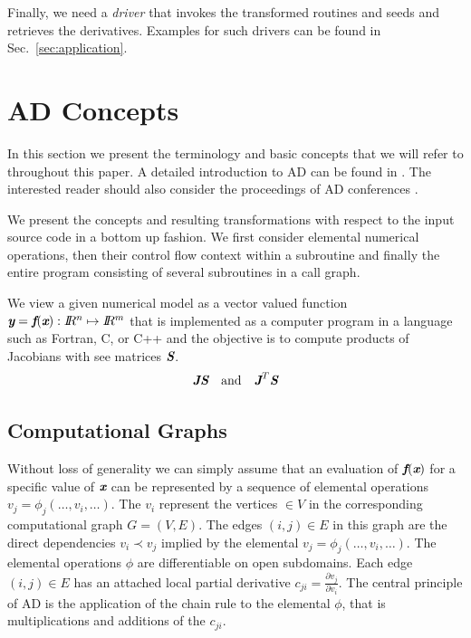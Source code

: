 \documentclass{book}
\newcommand{\R}{I\!\!R}
\newcommand{\bmf}{\mbox{\bf\em f}}
\newcommand{\bmJ}{\mbox{\bf\em J}}
\newcommand{\bmS}{\mbox{\bf\em S}}
\newcommand{\bmx}{\mbox{\bf\em x}}
\newcommand{\bmy}{\mbox{\bf\em y}}
\newcommand{\refsec}[1]{{Sec.~\ref{#1}}}
\begin{document}
Finally, we need a {\em driver} that invokes the transformed routines and seeds and retrieves the derivatives.
Examples for such drivers can be found in \refsec{sec:application}.

\chapter{AD Concepts}\label{sec:ADIntro}

In this section we present the terminology and basic concepts that 
we will refer to throughout this paper. 
A detailed introduction to AD can be found in \cite{Gri00}.
The interested reader should also consider the proceedings of AD 
conferences \cite{CG91,BBCG96,CFG+01,BCH+06}.

We present the concepts and resulting transformations 
with respect to the input source code 
in a bottom up fashion.  
We first consider elemental numerical operations, 
then their control flow context within a subroutine and finally the entire program 
consisting of several subroutines in a call graph. 

We view a given numerical model as a 
vector valued function $\bmy=\bmf(\bmx): \R^n\mapsto \R^m$ that is implemented 
as a computer program in a language such as Fortran, C, or C++ and the objective is to  
compute products of Jacobians with see matrices $\bmS$.
\begin{equation}\label{eqn:JacVecProds}
\bmJ \bmS \quad \mbox{and} \quad \bmJ^T \bmS
\end{equation}
\section{Computational Graphs} \label{sec:computationalGraphs}

Without loss of generality we can simply assume that an evaluation of $\bmf(\bmx)$ for  
a specific value of $\bmx$ can be represented by a sequence of 
elemental operations $v_j=\phi_j(\ldots,v_i,\ldots)$. 
The $v_i$ represent the vertices $\in V$ in the corresponding computational 
graph $G=(V,E)$. The edges $(i,j)\in E$ in this graph are the direct dependencies 
$v_i\prec v_j$ implied by the elemental $v_j=\phi_j(\ldots,v_i,\ldots)$.
The elemental operations $\phi$ are differentiable on open subdomains. 
Each edge $(i,j)\in E$ has an attached local partial derivative 
$c_{ji}=\frac{\partial v_j}{\partial v_i}$. 
The central principle of AD is 
the application of the chain rule to the elemental $\phi$, that is 
multiplications and additions of the  $c_{ji}$.  
\end{document}
